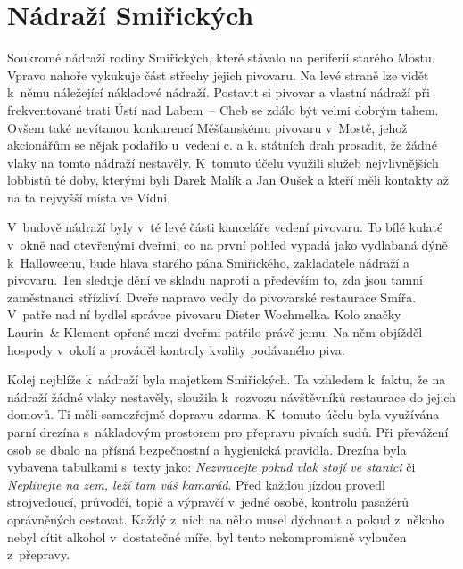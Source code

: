 
\chapter{Nádraží Smiřických}

Soukromé nádraží rodiny Smiřických, které stávalo na periferii starého Mostu.
Vpravo nahoře vykukuje část střechy jejich pivovaru. Na levé straně lze vidět
k~němu náležející nákladové nádraží. Postavit si pivovar a vlastní nádraží při
frekventované trati Ústí nad Labem~-- Cheb se zdálo být velmi dobrým tahem.
Ovšem také nevítanou konkurencí Měšťanskému pivovaru v~Mostě, jehož akcionářům
se nějak podařilo u~vedení c. a k. státních drah prosadit, že žádné vlaky na
tomto nádraží nestavěly. K~tomuto účelu využili služeb nejvlivnějších lobbistů
té doby, kterými byli Darek Malík a Jan Oušek a kteří měli kontakty až na ta
nejvyšší místa ve Vídni.

V~budově nádraží byly v~té levé části kanceláře vedení pivovaru. To bílé kulaté
v~okně nad otevřenými dveřmi, co na první pohled vypadá jako vydlabaná dýně
k~Halloweenu, bude hlava starého pána Smiřického, zakladatele nádraží a
pivovaru. Ten sleduje dění ve skladu naproti a především to, zda jsou tamní
zaměstnanci střízliví. Dveře napravo vedly do pivovarské restaurace Smířa.
V~patře nad ní bydlel správce pivovaru Dieter Wochmelka. Kolo značky Laurin~&
Klement opřené mezi dveřmi patřilo právě jemu. Na něm objížděl hospody v~okolí
a prováděl kontroly kvality podávaného piva.

Kolej nejblíže k~nádraží byla majetkem Smiřických. Ta vzhledem k~faktu, že na
nádraží žádné vlaky nestavěly, sloužila k~rozvozu návštěvníků restaurace do
jejich domovů. Ti měli samozřejmě dopravu zdarma. K~tomuto účelu byla využívána
parní drezína s~nákladovým prostorem pro přepravu pivních sudů. Při převážení
osob se dbalo na přísná bezpečnostní a hygienická pravidla. Drezína byla
vybavena tabulkami s~texty jako: {\em Nezvracejte pokud vlak stojí ve stanici}
či {\em Neplivejte na zem, leží tam váš kamarád}. Před každou jízdou provedl
strojvedoucí, průvodčí, topič a výpravčí v~jedné osobě, kontrolu pasažérů
oprávněných cestovat. Každý z~nich na něho musel dýchnout a pokud z~někoho
nebyl cítit alkohol v~dostatečné míře, byl tento nekompromisně vyloučen
z~přepravy.

